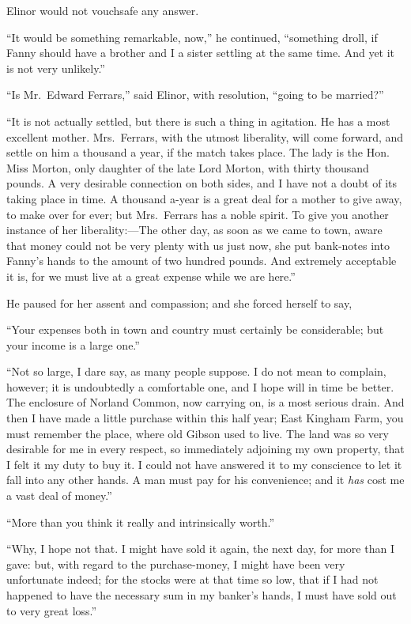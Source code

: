 Elinor would not vouchsafe any answer.

``It would be something remarkable, now,'' he continued,
``something droll, if Fanny should have a brother and I
a sister settling at the same time.  And yet it is not
very unlikely.''

``Is Mr.\ Edward Ferrars,'' said Elinor, with resolution,
``going to be married?''

``It is not actually settled, but there is such
a thing in agitation.  He has a most excellent mother.
Mrs.\ Ferrars, with the utmost liberality, will come forward,
and settle on him a thousand a year, if the match
takes place.  The lady is the Hon. Miss Morton, only daughter
of the late Lord Morton, with thirty thousand pounds.
A very desirable connection on both sides, and I have not
a doubt of its taking place in time.  A thousand a-year
is a great deal for a mother to give away, to make over
for ever; but Mrs.\ Ferrars has a noble spirit.  To give
you another instance of her liberality:---The other day,
as soon as we came to town, aware that money could
not be very plenty with us just now, she put bank-notes
into Fanny's hands to the amount of two hundred pounds.
And extremely acceptable it is, for we must live at a great
expense while we are here.''

He paused for her assent and compassion; and she
forced herself to say,

``Your expenses both in town and country must certainly
be considerable; but your income is a large one.''

``Not so large, I dare say, as many people suppose.
I do not mean to complain, however; it is undoubtedly
a comfortable one, and I hope will in time be better.
The enclosure of Norland Common, now carrying on,
is a most serious drain.  And then I have made a little
purchase within this half year; East Kingham Farm,
you must remember the place, where old Gibson used to live.
The land was so very desirable for me in every respect,
so immediately adjoining my own property, that I felt it
my duty to buy it.  I could not have answered it to my
conscience to let it fall into any other hands.  A man must
pay for his convenience; and it \emph{has} cost me a vast deal
of money.''

``More than you think it really and intrinsically worth.''

``Why, I hope not that.  I might have sold it again,
the next day, for more than I gave: but, with regard to the
purchase-money, I might have been very unfortunate indeed;
for the stocks were at that time so low, that if I had not
happened to have the necessary sum in my banker's hands,
I must have sold out to very great loss.''

